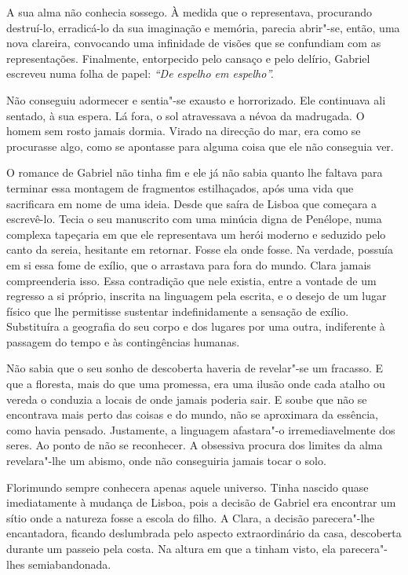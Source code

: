 A sua alma não conhecia sossego. À medida que o representava, procurando
destruí-lo, erradicá-lo da sua imaginação e memória, parecia abrir"-se,
então, uma nova clareira, convocando uma infinidade de visões que se
confundiam com as representações. Finalmente, entorpecido pelo cansaço e
pelo delírio, Gabriel escreveu numa folha de papel: \emph{``De espelho
em espelho''.}

Não conseguiu adormecer e sentia"-se exausto e horrorizado. Ele
continuava ali sentado, à sua espera. Lá fora, o sol atravessava a névoa
da madrugada. O homem sem rosto jamais dormia. Virado na direcção do
mar, era como se procurasse algo, como se apontasse para alguma coisa
que ele não conseguia ver.

O romance de Gabriel não tinha fim e ele já não sabia quanto lhe faltava
para terminar essa montagem de fragmentos estilhaçados, após uma vida
que sacrificara em nome de uma ideia. Desde que saíra de Lisboa que
começara a escrevê-lo. Tecia o seu manuscrito com uma minúcia digna de
Penélope, numa complexa tapeçaria em que ele representava um herói
moderno e seduzido pelo canto da sereia, hesitante em retornar. Fosse
ela onde fosse. Na verdade, possuía em si essa fome de exílio, que o
arrastava para fora do mundo. Clara jamais compreenderia isso. Essa
contradição que nele existia, entre a vontade de um regresso a si
próprio, inscrita na linguagem pela escrita, e o desejo de um lugar
físico que lhe permitisse sustentar indefinidamente a sensação de
exílio. Substituíra a geografia do seu corpo e dos lugares por uma
outra, indiferente à passagem do tempo e às contingências humanas.

Não sabia que o seu sonho de descoberta haveria de revelar"-se um
fracasso. E que a floresta, mais do que uma promessa, era uma ilusão
onde cada atalho ou vereda o conduzia a locais de onde jamais poderia
sair. E soube que não se encontrava mais perto das coisas e do mundo,
não se aproximara da essência, como havia pensado. Justamente, a
linguagem afastara"-o irremediavelmente dos seres. Ao ponto de não se
reconhecer. A obsessiva procura dos limites da alma revelara"-lhe um
abismo, onde não conseguiria jamais tocar o solo.

Florimundo sempre conhecera apenas aquele universo. Tinha nascido quase
imediatamente à mudança de Lisboa, pois a decisão de Gabriel era
encontrar um sítio onde a natureza fosse a escola do filho. A Clara, a
decisão parecera"-lhe encantadora, ficando deslumbrada pelo aspecto
extraordinário da casa, descoberta durante um passeio pela costa. Na
altura em que a tinham visto, ela parecera"-lhes semiabandonada.

